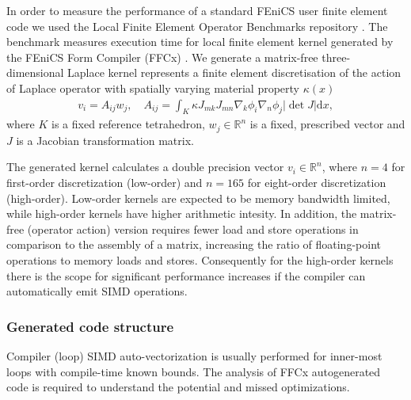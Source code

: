 In order to measure the performance of a standard FEniCS user finite element
code we used the Local Finite Element Operator Benchmarks repository
\citep{Baratta2023}. The benchmark measures execution time for local finite
element kernel generated by the FEniCS Form Compiler (FFCx)
\citep{kirby_compiler_2006}. We generate a matrix-free three-dimensional
Laplace kernel represents a finite element discretisation of the action of
Laplace operator with spatially varying material property $\kappa(x)$
\begin{align}
    v_i = A_{ij} w_j, \quad
    A_{ij} = \int_K \kappa J_{mk} J_{mn} \nabla_k \phi_i \nabla_n \phi_j |\det J| \mathrm dx,
\end{align}
where $K$ is a fixed reference tetrahedron, $w_j \in \mathbb{R}^{n}$ is a fixed,
prescribed vector and $J$ is a Jacobian transformation matrix.

The generated kernel calculates a double precision vector $v_i \in
\mathbb{R}^{n}$, where $n = 4$ for first-order discretization (low-order) and
$n = 165$ for eight-order discretization (high-order). Low-order kernels are
expected to be memory bandwidth limited, while high-order kernels have higher
arithmetic intesity. In addition, the matrix-free (operator action) version
requires fewer load and store operations in comparison to the assembly of a
matrix, increasing the ratio of floating-point operations to memory loads and
stores. Consequently for the high-order kernels there is the scope for
significant performance increases if the compiler can automatically emit SIMD
operations.

\subsubsection*{Generated code structure}

Compiler (loop) SIMD auto-vectorization is usually performed for inner-most
loops with compile-time known bounds. The analysis of FFCx autogenerated code
is required to understand the potential and missed optimizations.

